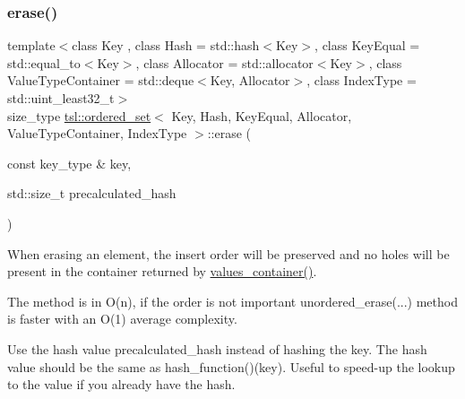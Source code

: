 \subsubsection{\texorpdfstring{erase()}{erase()}\hspace{0.1cm}{\footnotesize\ttfamily [5/7]}}
{\footnotesize\ttfamily template$<$class Key , class Hash  = std\+::hash$<$\+Key$>$, class Key\+Equal  = std\+::equal\+\_\+to$<$\+Key$>$, class Allocator  = std\+::allocator$<$\+Key$>$, class Value\+Type\+Container  = std\+::deque$<$\+Key, Allocator$>$, class Index\+Type  = std\+::uint\+\_\+least32\+\_\+t$>$ \\
size\+\_\+type \mbox{\hyperlink{classtsl_1_1ordered__set}{tsl\+::ordered\+\_\+set}}$<$ Key, Hash, Key\+Equal, Allocator, Value\+Type\+Container, Index\+Type $>$\+::erase (\begin{DoxyParamCaption}\item[{const key\+\_\+type \&}]{key,  }\item[{std\+::size\+\_\+t}]{precalculated\+\_\+hash }\end{DoxyParamCaption})\hspace{0.3cm}{\ttfamily [inline]}}





When erasing an element, the insert order will be preserved and no holes will be present in the container returned by \textquotesingle{}\mbox{\hyperlink{classtsl_1_1ordered__set_a1bc951514a5c4c29c14b6cf5177cf1ec}{values\+\_\+container()}}\textquotesingle{}.

The method is in O(n), if the order is not important \textquotesingle{}unordered\+\_\+erase(...)\textquotesingle{} method is faster with an O(1) average complexity.

Use the hash value \textquotesingle{}precalculated\+\_\+hash\textquotesingle{} instead of hashing the key. The hash value should be the same as hash\+\_\+function()(key). Useful to speed-\/up the lookup to the value if you already have the hash. \mbox{\label{classtsl_1_1ordered__set_aabc0464c0f492f1b411fcef7ac396936}} 
